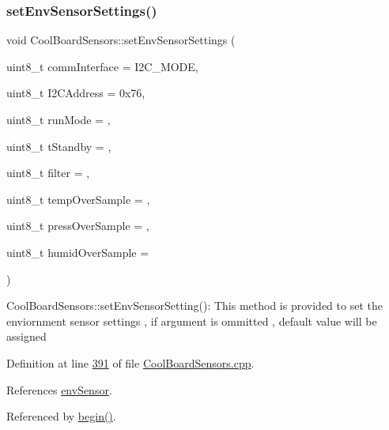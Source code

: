 \subsubsection{\texorpdfstring{set\+Env\+Sensor\+Settings()}{setEnvSensorSettings()}}
{\footnotesize\ttfamily void Cool\+Board\+Sensors\+::set\+Env\+Sensor\+Settings (\begin{DoxyParamCaption}\item[{uint8\+\_\+t}]{comm\+Interface = {\ttfamily I2C\+\_\+MODE},  }\item[{uint8\+\_\+t}]{I2\+C\+Address = {\ttfamily 0x76},  }\item[{uint8\+\_\+t}]{run\+Mode = {},  }\item[{uint8\+\_\+t}]{t\+Standby = {},  }\item[{uint8\+\_\+t}]{filter = {},  }\item[{uint8\+\_\+t}]{temp\+Over\+Sample = {},  }\item[{uint8\+\_\+t}]{press\+Over\+Sample = {},  }\item[{uint8\+\_\+t}]{humid\+Over\+Sample = {} }\end{DoxyParamCaption})}

Cool\+Board\+Sensors\+::set\+Env\+Sensor\+Setting()\+: This method is provided to set the enviornment sensor settings , if argument is ommitted , default value will be assigned 

Definition at line \hyperlink{_cool_board_sensors_8cpp_source_l00391}{391} of file \hyperlink{_cool_board_sensors_8cpp_source}{Cool\+Board\+Sensors.\+cpp}.



References \hyperlink{_cool_board_sensors_8h_source_l00077}{env\+Sensor}.



Referenced by \hyperlink{_cool_board_sensors_8cpp_source_l00085}{begin()}.



